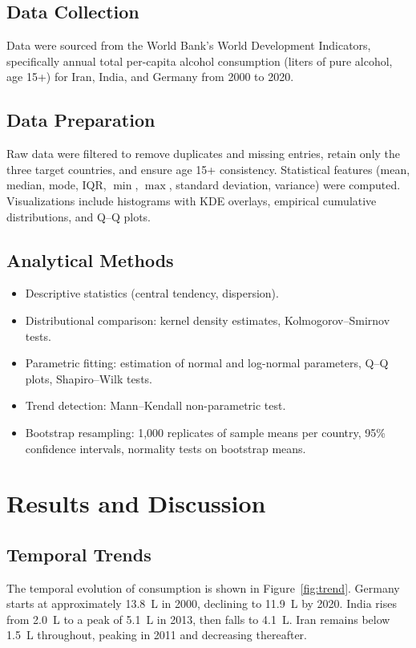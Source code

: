 \documentclass[12pt,a4paper]{article}
\begin{document}
	\subsection{Data Collection}
	Data were sourced from the World Bank's World Development Indicators, specifically annual total per-capita alcohol consumption (liters of pure alcohol, age 15+) for Iran, India, and Germany from 2000 to 2020.
	
	\subsection{Data Preparation}
	Raw data were filtered to remove duplicates and missing entries, retain only the three target countries, and ensure age 15+ consistency. Statistical features (mean, median, mode, IQR, \(\min\), \(\max\), standard deviation, variance) were computed. Visualizations include histograms with KDE overlays, empirical cumulative distributions, and Q--Q plots.
	
	\subsection{Analytical Methods}
	\begin{itemize}
		\item Descriptive statistics (central tendency, dispersion).
		\item Distributional comparison: kernel density estimates, Kolmogorov--Smirnov tests.
		\item Parametric fitting: estimation of normal and log-normal parameters, Q--Q plots, Shapiro--Wilk tests.
		\item Trend detection: Mann--Kendall non-parametric test.
		\item Bootstrap resampling: 1,000 replicates of sample means per country, 95\% confidence intervals, normality tests on bootstrap means.
	\end{itemize}
	
	\section{Results and Discussion}
	
	\subsection{Temporal Trends}
	The temporal evolution of consumption is shown in Figure~\ref{fig:trend}. Germany starts at approximately 13.8~L in 2000, declining to 11.9~L by 2020. India rises from 2.0~L to a peak of 5.1~L in 2013, then falls to 4.1~L. Iran remains below 1.5~L throughout, peaking in 2011 and decreasing thereafter.
	
\end{document}
